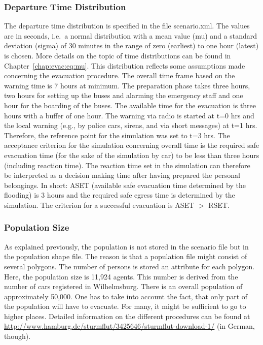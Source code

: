 \subsubsection{Departure Time Distribution}
The departure time distribution is specified in the file scenario.xml. The values are in seconds, i.e.\ a normal distribution with a mean value (mu) and a standard deviation (sigma) of 30 minutes in the range of zero (earliest) to one hour (latest) is chosen. 
More details on the topic of time distributions can be found in Chapter~\ref{chap:evac:eq:mu}. This distribution reflects some assumptions made concerning the evacuation procedure. The overall time frame based on the warning time is 7 hours at minimum. The preparation phase takes three hours, two hours for setting up the buses and alarming the emergency staff and one hour for the boarding of the buses. The available time for the evacuation is three hours with a buffer of one hour. 
The warning via radio is started at t=0 hrs and the local warning (e.g., by police cars, sirens, and via short messages) at t=1 hrs. Therefore, the reference point for the simulation was set to t=3 hrs. The acceptance criterion for the simulation concerning overall time is the required safe evacuation time (for the sake of the simulation by car) to be less than three hours (including reaction time). The reaction time set in the simulation can therefore be interpreted as a decision making time after having prepared the personal belongings. In short: ASET (available safe evacuation time determined by the flooding) is 3 hours and the required safe egress time is determined by the simulation. The criterion for a successful evacuation is ASET $>$ RSET.

\subsubsection{Population Size}
As explained previously, the population is not stored in the scenario file but in the population shape file. The reason is that a population file might consist of several polygons.  The number of persons is stored an attribute for each polygon. Here, the population size is 11,924 agents. This number is derived from the number of cars registered in Wilhelmsburg. There is an overall population of approximately 50,000. One has to take into account the fact, that only part of the population will have to evacuate. For many, it might be sufficient to go to higher places. Detailed information on the different procedures can be found at \url{http://www.hamburg.de/sturmflut/3425646/sturmflut-download-1/} (in German, though).

